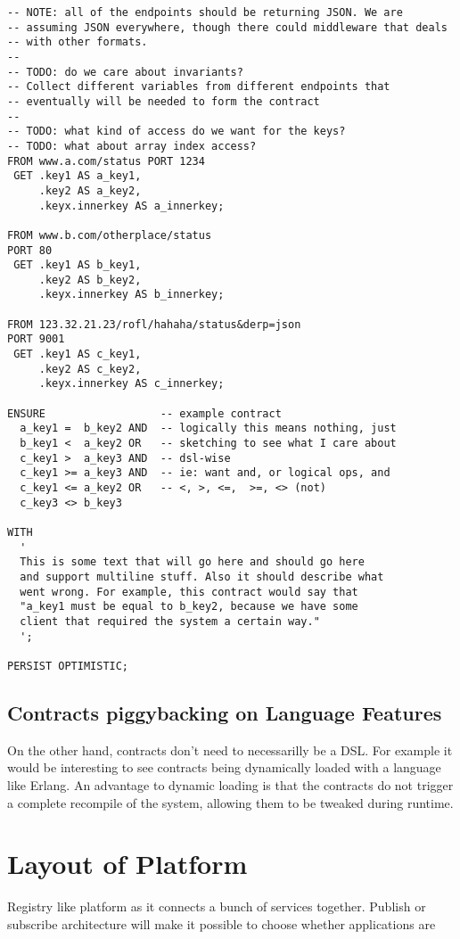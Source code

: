\documentclass[12pt,twoside]{article}
\begin{document}
\begin{lstlisting}[language=nouscontract,caption='Sample Contract']
-- NOTE: all of the endpoints should be returning JSON. We are
-- assuming JSON everywhere, though there could middleware that deals
-- with other formats.
--
-- TODO: do we care about invariants?
-- Collect different variables from different endpoints that
-- eventually will be needed to form the contract
--
-- TODO: what kind of access do we want for the keys?
-- TODO: what about array index access?
FROM www.a.com/status PORT 1234
 GET .key1 AS a_key1,
     .key2 AS a_key2,
     .keyx.innerkey AS a_innerkey;

FROM www.b.com/otherplace/status
PORT 80
 GET .key1 AS b_key1,
     .key2 AS b_key2,
     .keyx.innerkey AS b_innerkey;

FROM 123.32.21.23/rofl/hahaha/status&derp=json
PORT 9001
 GET .key1 AS c_key1,
     .key2 AS c_key2,
     .keyx.innerkey AS c_innerkey;

ENSURE                  -- example contract
  a_key1 =  b_key2 AND  -- logically this means nothing, just
  b_key1 <  a_key2 OR   -- sketching to see what I care about
  c_key1 >  a_key3 AND  -- dsl-wise
  c_key1 >= a_key3 AND  -- ie: want and, or logical ops, and
  c_key1 <= a_key2 OR   -- <, >, <=,  >=, <> (not)
  c_key3 <> b_key3

WITH
  '
  This is some text that will go here and should go here
  and support multiline stuff. Also it should describe what
  went wrong. For example, this contract would say that
  "a_key1 must be equal to b_key2, because we have some
  client that required the system a certain way."
  ';

PERSIST OPTIMISTIC;
\end{lstlisting}

\subsection{Contracts piggybacking on Language Features}
On the other hand, contracts don't need to necessarilly be a DSL. For
example it would be interesting to see contracts being dynamically
loaded with a language like Erlang. An advantage to dynamic loading is
that the contracts do not trigger a complete recompile of the system,
allowing them to be tweaked during runtime.

\section{Layout of Platform}
Registry like platform as it connects a bunch of services
together. Publish or subscribe architecture will make it possible to
choose whether applications are
\end{document}
